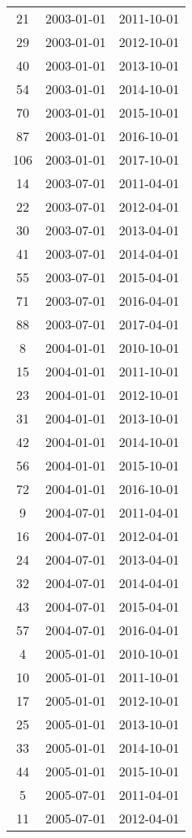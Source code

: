\begin{tabular}{ccc}
  21 & 2003-01-01 & 2011-10-01 \\ 
  29 & 2003-01-01 & 2012-10-01 \\ 
  40 & 2003-01-01 & 2013-10-01 \\ 
  54 & 2003-01-01 & 2014-10-01 \\ 
  70 & 2003-01-01 & 2015-10-01 \\ 
  87 & 2003-01-01 & 2016-10-01 \\ 
  106 & 2003-01-01 & 2017-10-01 \\ 
  14 & 2003-07-01 & 2011-04-01 \\ 
  22 & 2003-07-01 & 2012-04-01 \\ 
  30 & 2003-07-01 & 2013-04-01 \\ 
  41 & 2003-07-01 & 2014-04-01 \\ 
  55 & 2003-07-01 & 2015-04-01 \\ 
  71 & 2003-07-01 & 2016-04-01 \\ 
  88 & 2003-07-01 & 2017-04-01 \\ 
  8 & 2004-01-01 & 2010-10-01 \\ 
  15 & 2004-01-01 & 2011-10-01 \\ 
  23 & 2004-01-01 & 2012-10-01 \\ 
  31 & 2004-01-01 & 2013-10-01 \\ 
  42 & 2004-01-01 & 2014-10-01 \\ 
  56 & 2004-01-01 & 2015-10-01 \\ 
  72 & 2004-01-01 & 2016-10-01 \\ 
  9 & 2004-07-01 & 2011-04-01 \\ 
  16 & 2004-07-01 & 2012-04-01 \\ 
  24 & 2004-07-01 & 2013-04-01 \\ 
  32 & 2004-07-01 & 2014-04-01 \\ 
  43 & 2004-07-01 & 2015-04-01 \\ 
  57 & 2004-07-01 & 2016-04-01 \\ 
  4 & 2005-01-01 & 2010-10-01 \\ 
  10 & 2005-01-01 & 2011-10-01 \\ 
  17 & 2005-01-01 & 2012-10-01 \\ 
  25 & 2005-01-01 & 2013-10-01 \\ 
  33 & 2005-01-01 & 2014-10-01 \\ 
  44 & 2005-01-01 & 2015-10-01 \\ 
  5 & 2005-07-01 & 2011-04-01 \\ 
  11 & 2005-07-01 & 2012-04-01 \\ 

\end{tabular}
